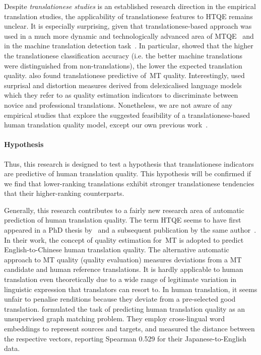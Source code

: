 Despite \textit{translationese studies} is an established research direction in the empirical translation studies, the applicability of translationese features to \gls{HTQE} remains unclear. It is especially surprising, given that translationese-based approach was used in a much more dynamic and technologically advanced area of \gls{MTQE}~\cite{Aharoni2015} and in the machine translation detection task~\cite{Carter2012}. In particular, \citet{Aharoni2015} showed that the higher the translationese classification accuracy (i.e. the better machine translations were distinguished from non-translations), the lower the expected translation quality. \citet{Aranberri2020} also found translationese predictive of~\gls{MT} quality. Interestingly, \citet{Rubino2016} used surprisal and distortion measures derived from delexicalised language models which they refer to as quality estimation indicators to discriminate between novice and professional translations.
Nonetheless, we are not aware of any empirical studies that explore the suggested feasibility of a translationese-based human translation quality model, except our own previous work~\cite{Kunilovskaya2019qua, Kunilovskaya2020vars}.

\paragraph{Hypothesis} Thus, this research is designed to test a hypothesis that translationese indicators are predictive of human translation quality. This hypothesis will be confirmed if we find that lower-ranking translations exhibit stronger translationese tendencies that their higher-ranking counterparts.  

Generally, this research contributes to a fairly new research area of automatic prediction of human translation quality. The term \gls{HTQE} seems to have first appeared in a PhD thesis by~\citet{Yuan2018} and a subsequent publication by the same author~\cite{Yuan2020}. In their work, the concept of quality estimation for~\gls*{MT} is adopted to predict English-to-Chinese human translation quality. 
The alternative automatic approach to MT quality (quality evaluation) measures deviations from a MT candidate and human reference translations. It is hardly applicable to human translation even theoretically due to a wide range of legitimate variation in linguistic expression that translators can resort to. In human translation, it seems unfair to penalise renditions because they deviate from a pre-selected good translation.
\citet{Zhou2019} formulated the task of predicting human translation quality as an unsupervised graph matching problem. They employ cross-lingual word embeddings to represent sources and targets, and measured the distance between the respective vectors, reporting Spearman 0.529 for their Japanese-to-English data. 

